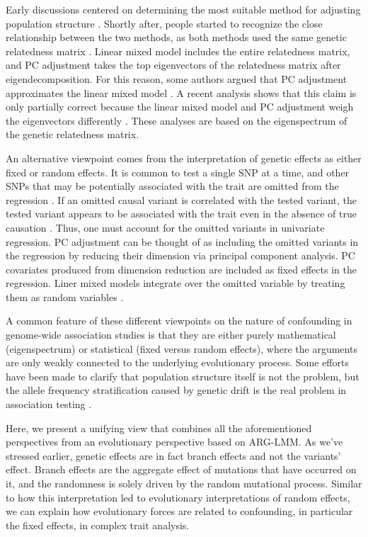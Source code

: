 Early discussions centered on determining the most suitable method for adjusting population structure \citep{price2010popstrat, sul2013selection}.
Shortly after, people started to recognize the close relationship between the two methods, 
as both methods used the same genetic relatedness matrix \citep{hoffman2013lmm}.
Linear mixed model includes the entire relatedness matrix,
and PC adjustment takes the top eigenvectors of the relatedness matrix after eigendecomposition.
For this reason,
some authors argued that PC adjustment approximates the linear mixed model \citep{hoffman2013lmm, yao2023limitationpca}.
A recent analysis shows that this claim is only partially correct
because the linear mixed model and PC adjustment weigh the eigenvectors
differently \citep{schraiber2024unifying}.
These analyses are based on the eigenspectrum of the genetic relatedness matrix.

An alternative viewpoint comes from the interpretation of genetic effects as either fixed or random effects.
It is common to test a single SNP at a time,
and other SNPs that may be potentially associated with the trait
are omitted from the regression \citep{sul2018confounding}.
If an omitted causal variant is correlated with the tested variant,
the tested variant appears to be associated with the trait even in the absence of true causation \citep{vilhjlmsson2012natureconfounding, sul2018confounding, veller2024interpreting}.
Thus, one must account for the omitted variants in univariate regression.
PC adjustment can be thought of as including the omitted variants in the regression by reducing their dimension via principal component analysis.
PC covariates produced from dimension reduction are included as fixed effects in the regression.
Liner mixed models integrate over the omitted variable by treating them as random variables \citep{sul2018confounding}.

A common feature of these different viewpoints on the nature of confounding in genome-wide association studies
is that they are either purely mathematical (eigenspectrum) or statistical (fixed versus random effects),
where the arguments are only weakly connected to the underlying evolutionary process.
Some efforts have been made to clarify that population structure itself is not the problem, 
but the allele frequency stratification caused by genetic drift is the real problem in association testing \citep{vilhjlmsson2012natureconfounding, edge2013windfalls}.

Here, we present a unifying view that combines all the aforementioned perspectives from an evolutionary perspective based on ARG-LMM.
As we've stressed earlier, 
genetic effects are in fact branch effects and not the variants' effect.
Branch effects are the aggregate effect of mutations that have occurred on it,
and the randomness is solely driven by the random mutational process.
Similar to how this interpretation led to evolutionary interpretations of random effects,
we can explain how evolutionary forces are related to confounding, in particular the fixed effects, in complex trait analysis.

